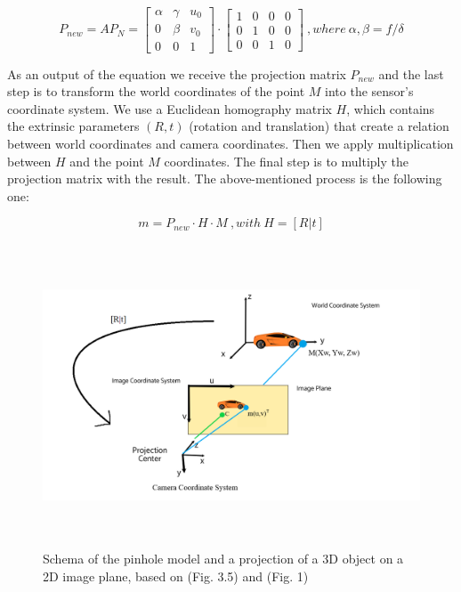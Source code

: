 \begin{equation}
    P_{new} = A P_{N} = \begin{bmatrix}
                        \alpha & \gamma & u_{0}\\
                        0 & \beta & v_{0}\\
                        0 & 0 & 1\end{bmatrix} \cdot \begin{bmatrix}
                        1 & 0 & 0 & 0\\
                        0 & 1 & 0 & 0\\
                        0 & 0 & 1 & 0\end{bmatrix} \: , where \: \alpha, \beta = f / \delta
\end{equation}

As an output of the equation we receive the projection matrix $P_{new}$ and the last step is to transform the world coordinates of the point $M$ into the sensor's coordinate system. We use a Euclidean homography matrix $H$, which contains the extrinsic parameters $(R,t)$ (rotation and translation) that create a relation between world coordinates and camera coordinates. Then we apply multiplication between $H$ and the point $M$ coordinates. The final step is to multiply the projection matrix with the result. The above-mentioned process is the following one:

\begin{equation}
m = P_{new} \cdot H \cdot M \:, with \: H = [R|t] 
\end{equation}

\begin{figure} [h!]
\centering
\includegraphics[width = \textwidth, height = 9cm]{images/camera_model_pic.png}
\caption[Single camera's model]{Schema of the pinhole model and a projection of a 3D object on a 2D image plane, based on \cite{camera_pinhole_model} (Fig. 3.5) and \cite{second_model_of_camera} (Fig. 1) \label{fig:camera_model}}
\end{figure}

